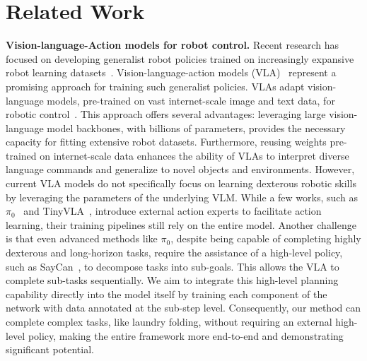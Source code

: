 \section{Related Work}
\textbf{Vision-language-Action models for robot control.} Recent research has focused on developing generalist robot policies trained on increasingly expansive robot learning datasets~\cite{fang2020graspnet, grauman2022ego4d, fu2024humanplus, ha2024umi, ha2023scaling, lin2024data, radosavovic2023real, chi2024universal,geiger2013vision}. Vision-language-action models (VLA)~\cite{kim24openvla,[pi0,pertsch2025fast,wen2024tinyvla,rt-2,zhen20243d,zhang2024grape,guo2025improving,belkhale2024rt-h} represent a promising approach for training such generalist policies. VLAs adapt vision-language models, pre-trained on vast internet-scale image and text data, for robotic control~\cite{yen2020learning}. This approach offers several advantages: leveraging large vision-language model backbones, with billions of parameters, provides the necessary capacity for fitting extensive robot datasets. Furthermore, reusing weights pre-trained on internet-scale data enhances the ability of VLAs to interpret diverse language commands and generalize to novel objects and environments. However, current VLA models do not specifically focus on learning dexterous robotic skills by leveraging the parameters of the underlying VLM. While a few works, such as $\pi_{0}$~\cite{[pi0} and TinyVLA~\cite{wen2024tinyvla}, introduce external action experts to facilitate action learning, their training pipelines still rely on the entire model. Another challenge is that even advanced methods like $\pi_{0}$, despite being capable of completing highly dexterous and long-horizon tasks, require the assistance of a high-level policy, such as SayCan~\cite{ahn2022can}, to decompose tasks into sub-goals. This allows the VLA to complete sub-tasks sequentially. We aim to integrate this high-level planning capability directly into the model itself by training each component of the network with data annotated at the sub-step level. Consequently, our method can complete complex tasks, like laundry folding, without requiring an external high-level policy, making the entire framework more end-to-end and demonstrating significant potential.

